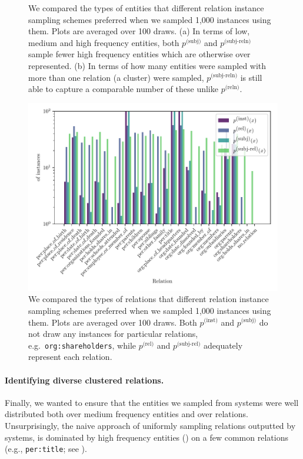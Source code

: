 \begin{figure}
   \caption[Comparison of relation sampling schemes on their entity distributions]{\label{fig:kbpo:selective-supervised}
   We compared the types of entities that different relation instance sampling schemes preferred when we sampled 1,000 instances using them.
   Plots are averaged over 100 draws.
   (a) In terms of low, medium and high frequency entities, both $p^{\text{(subj)}}$ and $p^{\text{(subj-reln)}}$ sample fewer high frequency entities which are otherwise over represented.
   (b) In terms of how many entities were sampled with more than one relation (a cluster) were sampled, $p^{\text{(subj-reln)}}$ is still able to capture a comparable number of these unlike $p^{\text{(reln)}}$.
   }
 \end{figure}
 
 \begin{figure}
   \centering
   \includegraphics[width=0.9\textheight, angle=-90]{figures/analysis/selective_supervised_relations}
   \caption[Comparison of relation sampling schemes on their relation distributions]{\label{fig:kbpo:selective-supervised-relation}
   We compared the types of relations that different relation instance sampling schemes preferred when we sampled 1,000 instances using them.
   Plots are averaged over 100 draws.
   Both $p^{\text{(inst)}}$ and $p^{\text{(subj)}}$ do not draw any instances for particular relations, e.g.\ \texttt{org:shareholders}, while
   $p^{\text{(rel)}}$ and $p^{\text{(subj-rel)}}$ adequately represent each relation.
   }
 \end{figure}
 
 \paragraph{Identifying diverse clustered relations.}
 Finally, we wanted to ensure that the entities we sampled from systems were well distributed both over medium frequency entities and over relations.
 Unsurprisingly, the naive approach of uniformly sampling relations outputted by systems, is dominated by  high frequency entities () on a few common relations (e.g., \texttt{per:title}; see ).
 
